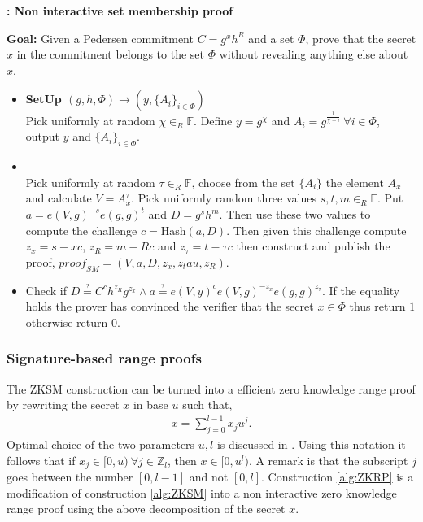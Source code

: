 \begin{algorithm}[]
\caption{\textbf{: Non interactive set membership proof}}
\textbf{Goal:} Given a Pedersen commitment $C=g^x h^R$ and a set $\Phi$, prove that the secret $x$ in the commitment belongs to the set $\Phi$ without revealing anything else about $x$.
\vspace{2pt} \hline \vspace{2pt}
\begin{itemize}
  \item\textbf{SetUp $(g,h,\Phi)\xrightarrow[]{}(y,\{A_{i}\}_{i\in\Phi})$}\\
Pick uniformly at random $\chi\in_R\mathds{F}$. Define $y=g^\chi$ and $A_i=g^{\frac{1}{\chi+i}} \:\forall i\in\Phi$, output $y$ and $\{A_i\}_{i\in\Phi }$.

\item{}\\
Pick uniformly at random $\tau\in_R\mathds{F}$, choose from the set $\{A_i\}$ the element $A_x$ and calculate $V=A_x^\tau$. Pick uniformly random three values $s,t,m\in_R\mathds{F}$. Put $a=e(V,g)^{-s}e(g,g)^t$ and $D=g^sh^m$. Then use these two values to compute the challenge $c=\text{Hash}(a,D)$. Then given this challenge compute $z_x = s-x c$, $z_R = m-Rc$ and $z_\tau= t-\tau c$ then construct and publish the proof, $\textit{proof}_{SM} = (V,a,D,z_x,z_tau,z_R)$.

\item{}
Check if $D\overset{?}{=}C^ch^{z_R}g^{z_x}\wedge a \overset{?}{=} e(V,y)^c e(V,g)^{-z_x}e(g,g)^{z_\tau}$. If the equality holds the prover has convinced the verifier that the secret $x\in\Phi$ thus return $1$ otherwise return $0$.
\end{itemize}
\label{alg:ZKSM}
\end{algorithm}

\subsubsection*{Signature-based range proofs}
The ZKSM construction can be turned into a efficient zero knowledge range proof by rewriting the secret $x$ in base $u$ such that,
\begin{align*}
    x = \sum_{j=0}^{l-1} x_ju^j.
\end{align*}
Optimal choice of the two parameters $u,l$ is discussed in \cite{RANGE-SET}. 
Using this notation it follows that if $x_j\in[0,u)\: \forall j\in\mathds{Z}_l$, then $x\in[0,u^l)$. A remark is that the subscript $j$ goes between the number $[0,l-1]$ and not $[0,l]$.
 Construction \ref{alg:ZKRP} is a modification of construction \ref{alg:ZKSM} into a non interactive zero knowledge range proof using the above decomposition of the secret $x$.

